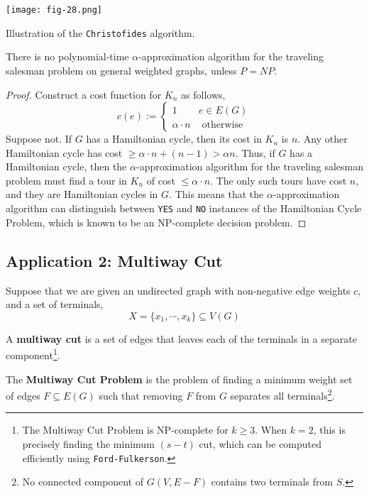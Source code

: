 \begin{marginfigure}
	\texttt{[image: fig-28.png]}
	\caption{Illustration of the \texttt{Christofides} algorithm.}
\end{marginfigure}

\begin{thm}
	There is no polynomial-time $\alpha$-approximation algorithm for the traveling salesman problem on general weighted graphs, unless $P = NP$.
\end{thm}

\begin{proof}
	Construct a cost function for $K_n$ as follows,
	\[
		c(e) := \begin{cases}
						1 & e \in E(G) \\
						\alpha \cdot n& \text{ otherwise}
				   \end{cases}
	\]
	\noindent  Suppose not. If $G$ has a Hamiltonian cycle, then its cost in $K_n$ is $n$. Any other Hamiltonian cycle has cost $\geq \alpha \cdot n + (n - 1) > \alpha n$. Thus, if $G$ has a Hamiltonian cycle, then the $\alpha$-approximation algorithm for the traveling salesman problem must find a tour in $K_n$ of cost $\leq \alpha \cdot n$. The only such tours have cost $n$, and they are Hamiltonian cycles in $G$. This means that the $\alpha$-approximation algorithm can distinguish between \texttt{YES} and \texttt{NO} instances of the Hamiltonian Cycle Problem, which is known to be an NP-complete decision problem.
\end{proof}

\subsection{Application 2: Multiway Cut}
Suppose that we are given an undirected graph  with non-negative edge weights $c$, and a set of terminals,
\[X = \{x_1, \cdots, x_k\} \subseteq V(G)\]

\begin{defn}
	A \textbf{multiway cut} is a set of edges that leaves each of the terminals in a separate component\footnote{The Multiway Cut Problem is NP-complete for $k \geq 3$. When $k = 2$, this is precisely finding the minimum $(s - t)$ cut, which can be computed efficiently using \texttt{Ford-Fulkerson}.}.
\end{defn}

\begin{defn}
	The \textbf{Multiway Cut Problem} is the problem of finding a minimum weight set of edges $F \subseteq E(G)$ such that removing $F$ from $G$ separates all terminals\footnote{No connected component of $G(V, E - F)$ contains two terminals from $S$.}.
\end{defn}

